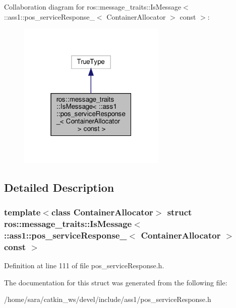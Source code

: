 Collaboration diagram for ros\+:\+:message\+\_\+traits\+:\+:Is\+Message$<$ \+:\+:ass1\+:\+:pos\+\_\+service\+Response\+\_\+$<$ Container\+Allocator $>$ const $>$\+:
\nopagebreak
\begin{figure}[H]
\begin{center}
\leavevmode
\includegraphics[width=199pt]{structros_1_1message__traits_1_1IsMessage_3_01_1_1ass1_1_1pos__serviceResponse___3_01ContainerAle9ebaae2dce60ce57f5a98060065fb75}
\end{center}
\end{figure}


\subsection{Detailed Description}
\subsubsection*{template$<$class Container\+Allocator$>$\newline
struct ros\+::message\+\_\+traits\+::\+Is\+Message$<$ \+::ass1\+::pos\+\_\+service\+Response\+\_\+$<$ Container\+Allocator $>$ const $>$}



Definition at line 111 of file pos\+\_\+service\+Response.\+h.



The documentation for this struct was generated from the following file\+:\begin{DoxyCompactItemize}
\item 
/home/sara/catkin\+\_\+ws/devel/include/ass1/pos\+\_\+service\+Response.\+h\end{DoxyCompactItemize}
